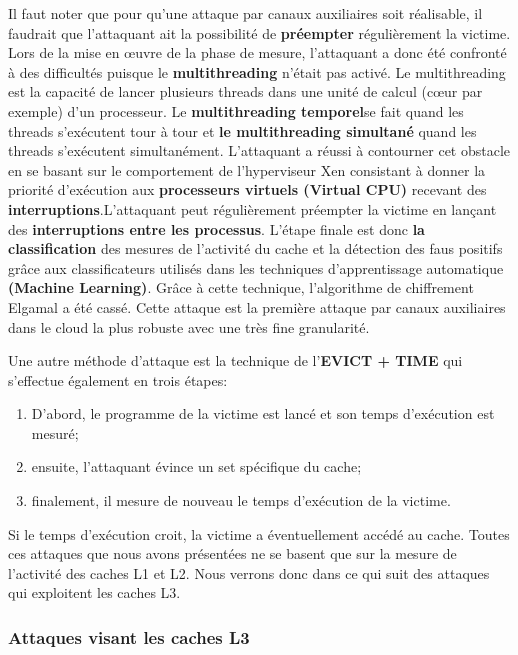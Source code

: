 \par

Il faut noter que pour qu’une attaque par canaux auxiliaires soit réalisable, il faudrait que l’attaquant ait la possibilité de \textbf{ préempter} régulièrement la victime. Lors de la mise en œuvre de la phase de mesure, l'attaquant a donc  été confronté à des difficultés  puisque le \textbf{ multithreading} n’était pas activé. Le multithreading est la capacité de lancer plusieurs threads dans une unité de calcul (cœur par exemple) d’un processeur. Le \textbf{ multithreading  temporel}se fait quand les threads s’exécutent tour à tour et \textbf{ le multithreading simultané } quand les threads s’exécutent simultanément. L'attaquant a réussi à contourner cet obstacle  en se basant sur le comportement de l’hyperviseur Xen consistant à donner la priorité d’exécution aux  \textbf{ processeurs virtuels (Virtual CPU)}  recevant des \textbf{interruptions}.L'attaquant peut régulièrement préempter la victime  en lançant des \textbf{ interruptions entre les processus}.  L'étape  finale est donc \textbf{ la classification}  des mesures de l'activité du cache et la détection des faus positifs grâce aux classificateurs utilisés dans les techniques d’apprentissage automatique \textbf{(Machine Learning)}. Grâce à cette technique, l’algorithme de chiffrement Elgamal \cite{ElGamal} a été cassé. Cette attaque est la première attaque par canaux auxiliaires dans le cloud la plus robuste avec une très fine granularité. \newline

\newline{}
\par 

Une autre méthode d'attaque est la technique  de l'\textbf{EVICT + TIME} \cite{Osvik} qui s'effectue également en trois étapes:
\begin{enumerate}
 \item D'abord, le programme de la victime est lancé et son temps d'exécution est mesuré;
 \item ensuite, l'attaquant évince un set spécifique du cache;
 \item finalement, il mesure de nouveau le temps d'exécution de la victime.
\end{enumerate}
Si le temps d'exécution croit, la victime a éventuellement accédé au cache.
Toutes  ces attaques  que nous avons présentées ne se basent que sur la mesure de l’activité des caches  L1 et L2. Nous verrons donc dans ce qui suit des attaques qui exploitent les caches L3.
\subsubsection{Attaques visant les caches L3}


